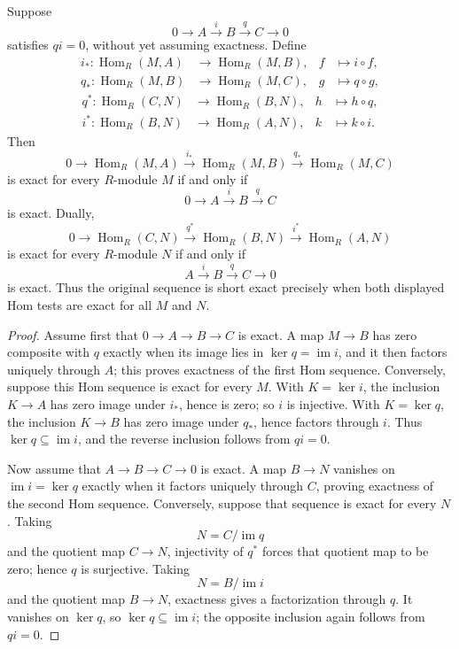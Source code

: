 \begin{proposition}\label{prop:hom-exactness}
Suppose
\[
0\longrightarrow A\xrightarrow{i}B\xrightarrow{q}C\longrightarrow0
\]
satisfies \(qi=0\), without yet assuming exactness.  Define
\[
\begin{aligned}
i_*:\operatorname{Hom}_R(M,A)&\longrightarrow\operatorname{Hom}_R(M,B),
&f&\longmapsto i\circ f,\\
q_*:\operatorname{Hom}_R(M,B)&\longrightarrow\operatorname{Hom}_R(M,C),
&g&\longmapsto q\circ g,
\end{aligned}
\]
\[
\begin{aligned}
q^*:\operatorname{Hom}_R(C,N)&\longrightarrow\operatorname{Hom}_R(B,N),
&h&\longmapsto h\circ q,\\
i^*:\operatorname{Hom}_R(B,N)&\longrightarrow\operatorname{Hom}_R(A,N),
&k&\longmapsto k\circ i.
\end{aligned}
\]
Then
\[
0\longrightarrow\operatorname{Hom}_R(M,A)\xrightarrow{i_*}
\operatorname{Hom}_R(M,B)\xrightarrow{q_*}\operatorname{Hom}_R(M,C)
\]
is exact for every \(R\)-module \(M\) if and only if
\[
0\longrightarrow A\xrightarrow{i}B\xrightarrow{q}C
\]
is exact.  Dually,
\[
0\longrightarrow\operatorname{Hom}_R(C,N)\xrightarrow{q^*}
\operatorname{Hom}_R(B,N)\xrightarrow{i^*}\operatorname{Hom}_R(A,N)
\]
is exact for every \(R\)-module \(N\) if and only if
\[
A\xrightarrow{i}B\xrightarrow{q}C\longrightarrow0
\]
is exact.  Thus the original sequence is short exact precisely when both
displayed Hom tests are exact for all \(M\) and \(N\).
\end{proposition}
\begin{proof}
Assume first that \(0\to A\to B\to C\) is exact.  A map \(M\to B\) has
zero composite with \(q\) exactly when its image lies in
\(\ker q=\operatorname{im}i\), and it then factors uniquely through \(A\);
this proves exactness of the first Hom sequence.  Conversely, suppose this
Hom sequence is exact for every \(M\).  With \(K=\ker i\), the inclusion
\(K\to A\) has zero image under \(i_*\), hence is zero; so \(i\) is
injective.  With \(K=\ker q\), the inclusion \(K\to B\) has zero image
under \(q_*\), hence factors through \(i\).  Thus
\(\ker q\subseteq\operatorname{im}i\), and the reverse inclusion follows
from \(qi=0\).

Now assume that \(A\to B\to C\to0\) is exact.  A map \(B\to N\) vanishes on
\(\operatorname{im}i=\ker q\) exactly when it factors uniquely through
\(C\), proving exactness of the second Hom sequence.  Conversely, suppose
that sequence is exact for every \(N\).  Taking
\[
N=C/\operatorname{im}q
\]
and the quotient map \(C\to N\), injectivity of \(q^*\) forces that quotient
map to be zero; hence \(q\) is surjective.  Taking
\[
N=B/\operatorname{im}i
\]
and the quotient map \(B\to N\), exactness gives a factorization through
\(q\).  It vanishes on \(\ker q\), so
\(\ker q\subseteq\operatorname{im}i\); the opposite inclusion again follows
from \(qi=0\).
\end{proof}

